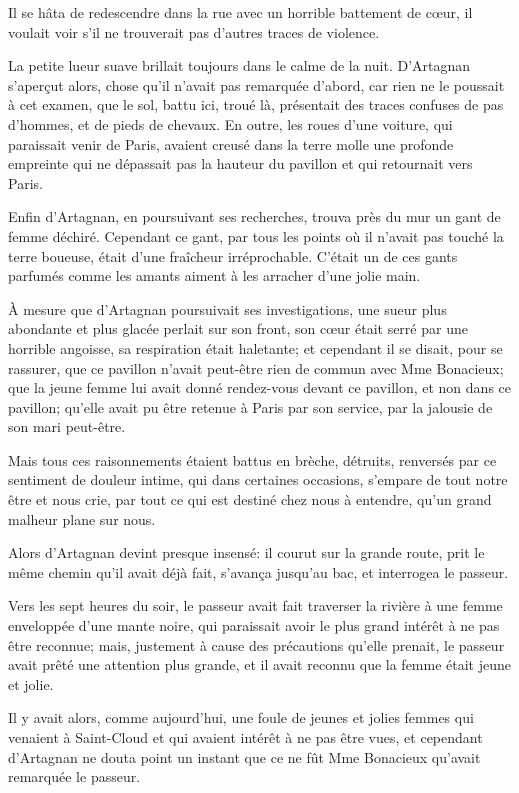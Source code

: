 Il se hâta de redescendre dans la rue avec un horrible battement de cœur, il voulait voir s'il ne trouverait pas d'autres traces de violence. 

La petite lueur suave brillait toujours dans le calme de la nuit. D'Artagnan s'aperçut alors, chose qu'il n'avait pas remarquée d'abord, car rien ne le poussait à cet examen, que le sol, battu ici, troué là, présentait des traces confuses de pas d'hommes, et de pieds de chevaux. En outre, les roues d'une voiture, qui paraissait venir de Paris, avaient creusé dans la terre molle une profonde empreinte qui ne dépassait pas la hauteur du pavillon et qui retournait vers Paris. 

Enfin d'Artagnan, en poursuivant ses recherches, trouva près du mur un gant de femme déchiré. Cependant ce gant, par tous les points où il n'avait pas touché la terre boueuse, était d'une fraîcheur irréprochable. C'était un de ces gants parfumés comme les amants aiment à les arracher d'une jolie main. 

À mesure que d'Artagnan poursuivait ses investigations, une sueur plus abondante et plus glacée perlait sur son front, son cœur était serré par une horrible angoisse, sa respiration était haletante; et cependant il se disait, pour se rassurer, que ce pavillon n'avait peut-être rien de commun avec Mme Bonacieux; que la jeune femme lui avait donné rendez-vous devant ce pavillon, et non dans ce pavillon; qu'elle avait pu être retenue à Paris par son service, par la jalousie de son mari peut-être. 

Mais tous ces raisonnements étaient battus en brèche, détruits, renversés par ce sentiment de douleur intime, qui dans certaines occasions, s'empare de tout notre être et nous crie, par tout ce qui est destiné chez nous à entendre, qu'un grand malheur plane sur nous. 

Alors d'Artagnan devint presque insensé: il courut sur la grande route, prit le même chemin qu'il avait déjà fait, s'avança jusqu'au bac, et interrogea le passeur. 

Vers les sept heures du soir, le passeur avait fait traverser la rivière à une femme enveloppée d'une mante noire, qui paraissait avoir le plus grand intérêt à ne pas être reconnue; mais, justement à cause des précautions qu'elle prenait, le passeur avait prêté une attention plus grande, et il avait reconnu que la femme était jeune et jolie. 

Il y avait alors, comme aujourd'hui, une foule de jeunes et jolies femmes qui venaient à Saint-Cloud et qui avaient intérêt à ne pas être vues, et cependant d'Artagnan ne douta point un instant que ce ne fût Mme Bonacieux qu'avait remarquée le passeur. 

